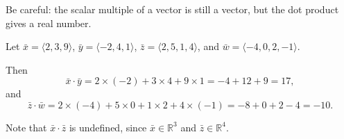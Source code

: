 \begin{notebox}
Be careful: the scalar multiple of a vector is still a vector, but the dot product gives a real number.
\end{notebox}

\begin{examplebox}
Let $\bar{x} = \langle 2, 3, 9 \rangle$, $\bar{y} = \langle -2, 4, 1 \rangle$, $\bar{z} = \langle 2, 5, 1, 4 \rangle$, and $\bar{w} = \langle -4, 0, 2, -1 \rangle$.

\noindent Then
\[
\bar{x} \cdot \bar{y} 
= 2 \times (-2) + 3 \times 4 + 9 \times 1 
= -4 + 12 + 9 
= 17,
\]
and
\[
\bar{z} \cdot \bar{w} 
= 2 \times (-4) + 5 \times 0 + 1 \times 2 + 4 \times (-1) 
= -8 + 0 + 2 - 4 
= -10.
\]

\noindent Note that $\bar{x} \cdot \bar{z}$ is undefined, since $\bar{x} \in \mathbb{R}^3$ and $\bar{z} \in \mathbb{R}^4$.
\end{examplebox}

